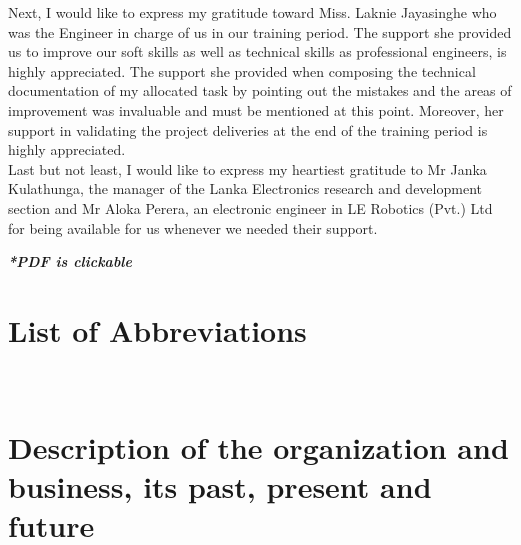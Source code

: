 \documentclass[a4paper,12pt]{report}
\begin{document}
Next, I would like to express my gratitude toward Miss. Laknie Jayasinghe who was the Engineer in charge of us in our training period. The support she provided us to improve our soft skills as well as technical skills as professional engineers, is highly appreciated. The support she provided when composing the technical documentation of my allocated task by pointing out the mistakes and the areas of improvement was invaluable and must be mentioned at this point. Moreover, her support in validating the project deliveries at the end of the training period is highly appreciated.\\

Last but not least, I would like to express my heartiest gratitude to Mr Janka Kulathunga, the manager of the Lanka Electronics research and development section and Mr Aloka Perera, an electronic engineer in LE Robotics (Pvt.) Ltd for being available for us whenever we needed their support.






\tableofcontents %
\vfill
\begin{center}
	\textbf{\textit{*PDF is clickable}}
\end{center}

\chapter*{List of Abbreviations}


\listoffigures %
\listoftables %


\newpage \ \newpage

\pagebreak
\setcounter{page}{1}

\chapter{Description of the organization and business, its past, present and	future}
\end{document}
